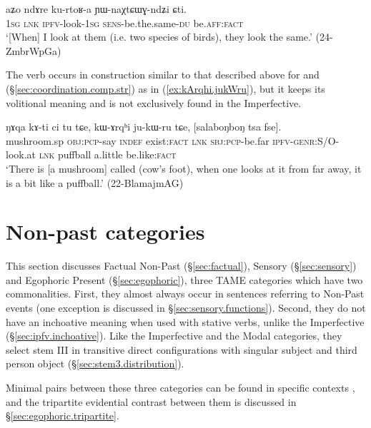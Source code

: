 \begin{exe}
\ex \label{ex:kurtoRa.YWnaXCtWGndZi}
\gll  aʑo ndɤre ku-rtoʁ-a ɲɯ-naχtɕɯɣ-ndʑi ɕti. \\
\textsc{1sg} \textsc{lnk} \textsc{ipfv}-look-\textsc{1sg} \textsc{sens}-be.the.same-\textsc{du} be.\textsc{aff}:\textsc{fact} \\
\glt `[When] I look at them (i.e. two species of birds), they look the same.' (24-ZmbrWpGa)
\end{exe}

The verb  occurs in construction similar to that described above for  and  (§\ref{sec:coordination.comp.str}) as in (\ref{ex:kArqhi.jukWru}), but it keeps its volitional meaning and is not exclusively found in the Imperfective.

\begin{exe}
\ex \label{ex:kArqhi.jukWru}
\gll ŋɤqa kɤ-ti ci tu tɕe, kɯ-ɤrqʰi ju-kɯ-ru tɕe, [salaboŋboŋ tsa fse].  \\
mushroom.sp \textsc{obj}:\textsc{pcp}-say \textsc{indef} exist:\textsc{fact} \textsc{lnk} \textsc{sbj}:\textsc{pcp}-be.far \textsc{ipfv}-\textsc{genr}:S/O-look.at \textsc{lnk} puffball a.little be.like:\textsc{fact} \\
\glt `There is [a mushroom] called  (cow's foot), when one looks at it from far away, it is a bit like a puffball.' (22-BlamajmAG)
\end{exe}

\section{Non-past categories} \label{sec:TAME.npst}
This section discusses Factual Non-Past (§\ref{sec:factual}), Sensory (§\ref{sec:sensory}) and Egophoric Present (§\ref{sec:egophoric}), three TAME categories which have two commonalities. First, they almost always occur in sentences referring to Non-Past events (one exception is discussed in §\ref{sec:sensory.functions}). Second, they do not have an inchoative meaning when used with stative verbs, unlike the Imperfective (§\ref{sec:ipfv.inchoative}). Like the Imperfective and the Modal categories, they select stem III in transitive direct configurations with singular subject and third person object (§\ref{sec:stem3.distribution}).

Minimal pairs between these three categories can be found in specific contexts \citep{jacques19egophoric}, and the tripartite evidential contrast between them is discussed in §\ref{sec:egophoric.tripartite}.

